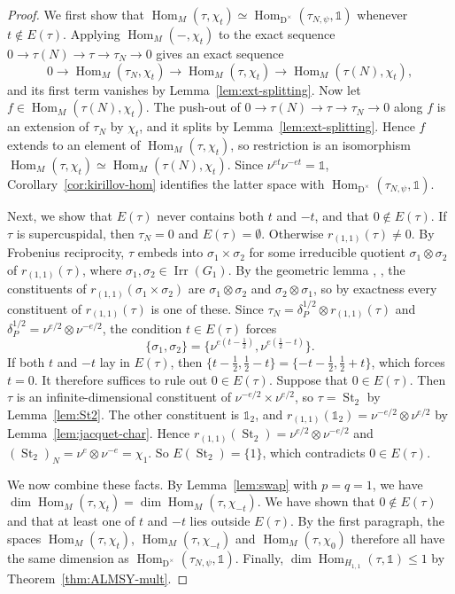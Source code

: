 \documentclass[11pt]{amsart}
\numberwithin{equation}{section}
\theoremstyle{plain}
\theoremstyle{definition}
\theoremstyle{remark}
\newcommand{\one}{\mathds{1}}
\DeclareMathOperator{\Hom}{Hom}
\DeclareMathOperator{\Irr}{Irr}
\DeclareMathOperator{\St}{St}
\begin{document}
\begin{proof}
	We first show that $\Hom_M(\tau,\chi_t)\simeq\Hom_{\mathrm{D}^\times}(\tau_{N,\psi},\one)$ whenever $t\notin E(\tau)$. Applying $\Hom_M(-,\chi_t)$ to the exact sequence $0\to\tau(N)\to\tau\to\tau_N\to0$ gives an exact sequence
	$$0\to\Hom_M(\tau_N,\chi_t)\to\Hom_M(\tau,\chi_t)\to\Hom_M(\tau(N),\chi_t),$$
	and its first term vanishes by Lemma~\ref{lem:ext-splitting}. Now let $f\in\Hom_M(\tau(N),\chi_t)$. The push-out of $0\to\tau(N)\to\tau\to\tau_N\to0$ along $f$ is an extension of $\tau_N$ by $\chi_t$, and it splits by Lemma~\ref{lem:ext-splitting}. Hence $f$ extends to an element of $\Hom_M(\tau,\chi_t)$, so restriction is an isomorphism $\Hom_M(\tau,\chi_t)\simeq\Hom_M(\tau(N),\chi_t)$. Since $\nu^{et}\nu^{-et}=\one$, Corollary~\ref{cor:kirillov-hom} identifies the latter space with $\Hom_{\mathrm{D}^\times}(\tau_{N,\psi},\one)$.
	
	Next, we show that $E(\tau)$ never contains both $t$ and $-t$, and that $0\notin E(\tau)$. If $\tau$ is supercuspidal, then $\tau_N=0$ and $E(\tau)=\emptyset$. Otherwise $r_{(1,1)}(\tau)\ne0$. By Frobenius reciprocity, $\tau$ embeds into $\sigma_1\times\sigma_2$ for some irreducible quotient $\sigma_1\otimes\sigma_2$ of $r_{(1,1)}(\tau)$, where $\sigma_1,\sigma_2\in\Irr(G_1)$. By the geometric lemma \cite[Theorem~5.2]{BZ77}, \cite{Tad90}, the constituents of $r_{(1,1)}(\sigma_1\times\sigma_2)$ are $\sigma_1\otimes\sigma_2$ and $\sigma_2\otimes\sigma_1$, so by exactness every constituent of $r_{(1,1)}(\tau)$ is one of these. Since $\tau_N=\delta_P^{1/2}\otimes r_{(1,1)}(\tau)$ and $\delta_P^{1/2}=\nu^{e/2}\otimes\nu^{-e/2}$, the condition $t\in E(\tau)$ forces
	$$\{\sigma_1,\sigma_2\}=\{\nu^{e(t-\frac12)},\nu^{e(\frac12-t)}\}.$$
	If both $t$ and $-t$ lay in $E(\tau)$, then $\{t-\frac12,\frac12-t\}=\{-t-\frac12,\frac12+t\}$, which forces $t=0$. It therefore suffices to rule out $0\in E(\tau)$. Suppose that $0\in E(\tau)$. Then $\tau$ is an infinite-dimensional constituent of $\nu^{-e/2}\times\nu^{e/2}$, so $\tau=\St_2$ by Lemma~\ref{lem:St2}. The other constituent is $\one_2$, and $r_{(1,1)}(\one_2)=\nu^{-e/2}\otimes\nu^{e/2}$ by Lemma~\ref{lem:jacquet-char}. Hence $r_{(1,1)}(\St_2)=\nu^{e/2}\otimes\nu^{-e/2}$ and $(\St_2)_N=\nu^e\otimes\nu^{-e}=\chi_1$. So $E(\St_2)=\{1\}$, which contradicts $0\in E(\tau)$.
	
	We now combine these facts. By Lemma~\ref{lem:swap} with $p=q=1$, we have $\dim\Hom_M(\tau,\chi_t)=\dim\Hom_M(\tau,\chi_{-t})$. We have shown that $0\notin E(\tau)$ and that at least one of $t$ and $-t$ lies outside $E(\tau)$. By the first paragraph, the spaces $\Hom_M(\tau,\chi_t)$, $\Hom_M(\tau,\chi_{-t})$ and $\Hom_M(\tau,\chi_0)$ therefore all have the same dimension as $\Hom_{\mathrm{D}^\times}(\tau_{N,\psi},\one)$. Finally, $\dim\Hom_{H_{1,1}}(\tau,\one)\le1$ by Theorem~\ref{thm:ALMSY-mult}.
\end{proof}
\end{document}
